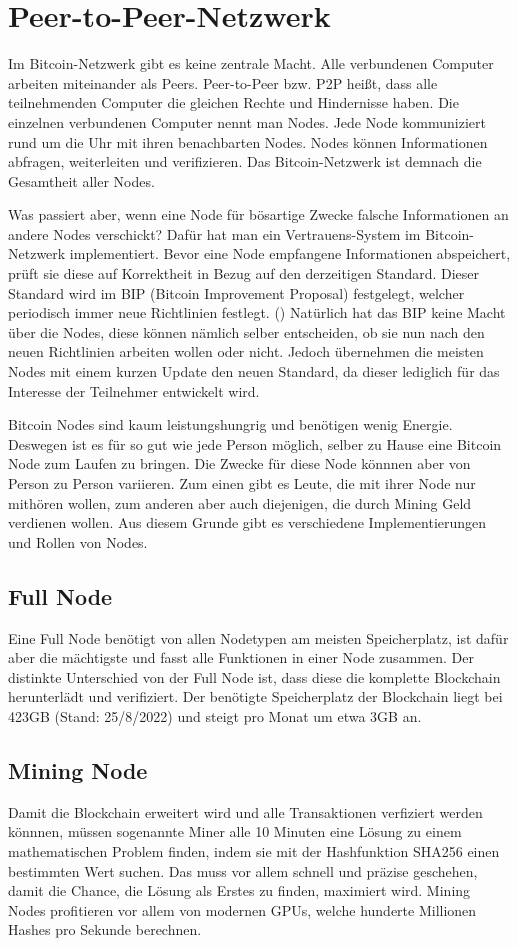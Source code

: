 \section{Peer-to-Peer-Netzwerk}
Im Bitcoin-Netzwerk gibt es keine zentrale Macht. Alle verbundenen Computer arbeiten miteinander als Peers. Peer-to-Peer
bzw. P2P heißt, dass alle teilnehmenden Computer die gleichen Rechte und Hindernisse haben. Die einzelnen verbundenen Computer
nennt man Nodes. Jede Node kommuniziert rund um die Uhr mit ihren benachbarten Nodes. Nodes können Informationen abfragen, 
weiterleiten und verifizieren. Das Bitcoin-Netzwerk ist demnach die Gesamtheit aller Nodes.

Was passiert aber, wenn eine Node für bösartige Zwecke falsche Informationen an andere Nodes verschickt? Dafür hat man ein
Vertrauens-System im Bitcoin-Netzwerk implementiert. Bevor eine Node empfangene Informationen abspeichert, prüft sie diese
auf Korrektheit in Bezug auf den derzeitigen Standard. Dieser Standard wird im BIP (Bitcoin Improvement Proposal) festgelegt,
welcher periodisch immer neue Richtlinien festlegt. () Natürlich hat das BIP keine Macht über die Nodes, diese können nämlich
selber entscheiden, ob sie nun nach den neuen Richtlinien arbeiten wollen oder nicht. Jedoch übernehmen die meisten Nodes mit
einem kurzen Update den neuen Standard, da dieser lediglich für das Interesse der Teilnehmer entwickelt wird.

Bitcoin Nodes sind kaum leistungshungrig und benötigen wenig Energie. Deswegen ist es für so gut wie jede Person möglich,
selber zu Hause eine Bitcoin Node zum Laufen zu bringen. Die Zwecke für diese Node könnnen aber von Person zu Person variieren.
Zum einen gibt es Leute, die mit ihrer Node nur mithören wollen, zum anderen aber auch diejenigen, die durch Mining Geld
verdienen wollen. Aus diesem Grunde gibt es verschiedene Implementierungen und Rollen von Nodes.

\subsection{Full Node}
Eine Full Node benötigt von allen Nodetypen am meisten Speicherplatz, ist dafür aber die mächtigste und fasst alle Funktionen in 
einer Node zusammen. Der distinkte Unterschied von der Full Node ist, dass diese die komplette Blockchain herunterlädt und
verifiziert. Der benötigte Speicherplatz der Blockchain liegt bei 423GB (Stand: 25/8/2022) und steigt pro Monat um etwa 3GB an.

\subsection{Mining Node}
Damit die Blockchain erweitert wird und alle Transaktionen verfiziert werden könnnen, müssen sogenannte Miner alle 10 Minuten
eine Lösung zu einem mathematischen Problem finden, indem sie mit der Hashfunktion SHA256 einen bestimmten Wert suchen. Das muss
vor allem schnell und präzise geschehen, damit die Chance, die Lösung als Erstes zu finden, maximiert wird. Mining Nodes 
profitieren vor allem von modernen GPUs, welche hunderte Millionen Hashes pro Sekunde berechnen.

